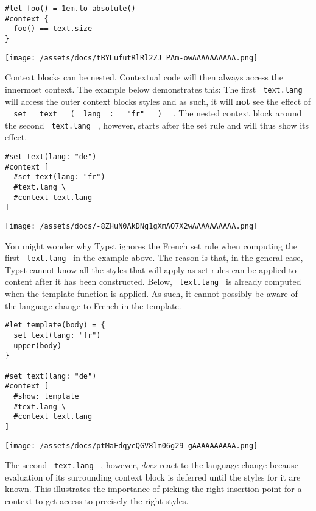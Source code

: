 \begin{verbatim}
#let foo() = 1em.to-absolute()
#context {
  foo() == text.size
}
\end{verbatim}

\texttt{[image: /assets/docs/tBYLufutRlRl2ZJ\_PAm-owAAAAAAAAAA.png]}

Context blocks can be nested. Contextual code will then always access
the innermost context. The example below demonstrates this: The first
\texttt{\ text.lang\ } will access the outer context
block\textquotesingle s styles and as such, it will \textbf{not} see the
effect of
\texttt{\ }{\texttt{\ set\ }}\texttt{\ }{\texttt{\ text\ }}\texttt{\ }{\texttt{\ (\ }}\texttt{\ lang\ }{\texttt{\ :\ }}\texttt{\ }{\texttt{\ "fr"\ }}\texttt{\ }{\texttt{\ )\ }}\texttt{\ }
. The nested context block around the second \texttt{\ text.lang\ } ,
however, starts after the set rule and will thus show its effect.

\begin{verbatim}
#set text(lang: "de")
#context [
  #set text(lang: "fr")
  #text.lang \
  #context text.lang
]
\end{verbatim}

\texttt{[image: /assets/docs/-8ZHuN0AkDNg1gXmAO7X2wAAAAAAAAAA.png]}

You might wonder why Typst ignores the French set rule when computing
the first \texttt{\ text.lang\ } in the example above. The reason is
that, in the general case, Typst cannot know all the styles that will
apply as set rules can be applied to content after it has been
constructed. Below, \texttt{\ text.lang\ } is already computed when the
template function is applied. As such, it cannot possibly be aware of
the language change to French in the template.

\begin{verbatim}
#let template(body) = {
  set text(lang: "fr")
  upper(body)
}

#set text(lang: "de")
#context [
  #show: template
  #text.lang \
  #context text.lang
]
\end{verbatim}

\texttt{[image: /assets/docs/ptMaFdqycQGV8lm06g29-gAAAAAAAAAA.png]}

The second \texttt{\ text.lang\ } , however, \emph{does} react to the
language change because evaluation of its surrounding context block is
deferred until the styles for it are known. This illustrates the
importance of picking the right insertion point for a context to get
access to precisely the right styles.

